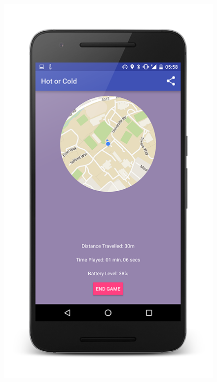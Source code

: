 \documentclass[10pt, a4paper]{article}
\begin{document}
\begin{figure}[!htb]
  \includegraphics[width=1.0\textwidth]{phone_game_2}
  \caption{}
\endminipage\hfill
{}%

\end{figure}
\end{document}
